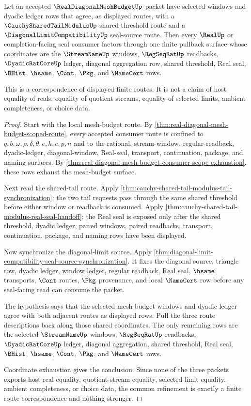 \begin{theorem}
\label{thm:real-diagonal-mesh-budget-common-refinement-seal}
Let an accepted $\RealDiagonalMeshBudgetUp$ packet have selected windows and dyadic ledger rows that agree, as displayed routes, with a $\CauchySharedTailModulusUp$ shared-threshold route and a $\DiagonalLimitCompatibilityUp$ seal-source route. Then every $\RealUp$ or completion-facing seal consumer factors through one finite pullback surface whose coordinates are the $\StreamNameUp$ windows, $\RegSeqRatUp$ readbacks, $\DyadicRatCoreUp$ ledger, diagonal aggregation row, shared threshold, Real seal, $\BHist$, $\hsame$, $\Cont$, $\Pkg$, and $\NameCert$ rows.

This is a correspondence of displayed finite routes. It is not a claim of host equality of reals, equality of quotient streams, equality of selected limits, ambient completeness, or choice data.
\end{theorem}
\begin{proof}
Start with the local mesh-budget route. By \autoref{thm:real-diagonal-mesh-budget-scoped-route}, every accepted consumer route is confined to $q,b,\omega,\rho,\delta,\theta,e,h,c,p,n$ and to the rational, stream-window, regular-readback, dyadic-ledger, diagonal-window, Real-seal, transport, continuation, package, and naming surfaces. By \autoref{thm:real-diagonal-mesh-budget-consumer-scope-exhaustion}, these rows exhaust the mesh-budget surface.

Next read the shared-tail route. Apply \autoref{thm:cauchy-shared-tail-modulus-tail-synchronization}: the two tail requests pass through the same shared threshold before either window or readback is consumed. Apply \autoref{thm:cauchy-shared-tail-modulus-real-seal-handoff}: the Real seal is exposed only after the shared threshold, dyadic ledger, paired windows, paired readbacks, transport, continuation, package, and naming rows have been displayed.

Now synchronize the diagonal-limit source. Apply \autoref{thm:diagonal-limit-compatibility-seal-source-synchronization}. It fixes the diagonal source, triangle row, dyadic ledger, window ledger, regular readback, Real seal, $\hsame$ transports, $\Cont$ routes, $\Pkg$ provenance, and local $\NameCert$ row before any seal-facing read can consume the packet.

The hypothesis says that the selected mesh-budget windows and dyadic ledger agree with both adjacent routes as displayed rows. Pull the three route descriptions back along those shared coordinates. The only remaining rows are the selected $\StreamNameUp$ windows, $\RegSeqRatUp$ readbacks, $\DyadicRatCoreUp$ ledger, diagonal aggregation, shared threshold, Real seal, $\BHist$, $\hsame$, $\Cont$, $\Pkg$, and $\NameCert$ rows.

Coordinate exhaustion gives the conclusion. Since none of the three packets exports host real equality, quotient-stream equality, selected-limit equality, ambient completeness, or choice data, the common refinement is exactly a finite route correspondence and nothing stronger.
\end{proof}
